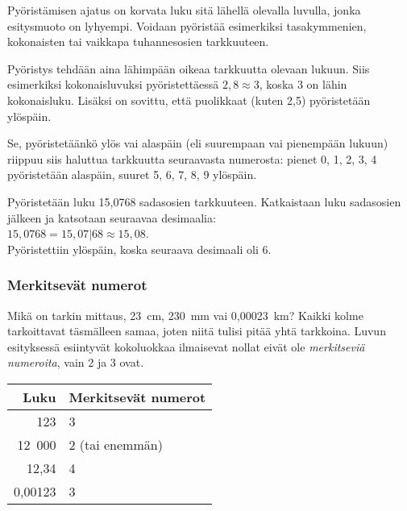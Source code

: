 Pyöristämisen ajatus on korvata luku sitä lähellä olevalla luvulla, jonka esitysmuoto on lyhyempi. Voidaan pyöristää esimerkiksi tasakymmenien, kokonaisten tai vaikkapa tuhannesosien tarkkuuteen.

Pyöristys tehdään aina lähimpään oikeaa tarkkuutta olevaan lukuun. Siis esimerkiksi kokonaisluvuksi pyöristettäessä $2,8 \approx 3$, koska 3 on lähin kokonaisluku. Lisäksi on sovittu, että puolikkaat (kuten 2,5) pyöristetään ylöspäin.

Se, pyöristetäänkö ylös vai alaspäin (eli suurempaan vai pienempään lukuun) riippuu siis haluttua tarkkuutta seuraavasta numerosta: pienet 0, 1, 2, 3, 4 pyöristetään alaspäin, suuret 5, 6, 7, 8, 9 ylöspäin.

\begin{esimerkki}
Pyöristetään luku 15,0768 sadasosien tarkkuuteen. Katkaistaan luku sadasosien jälkeen ja katsotaan seuraavaa desimaalia:\\
$15,0768 = 15,07|68 \approx 15,08$.\\
Pyöristettiin ylöspäin, koska seuraava desimaali oli 6.
\end{esimerkki}


\subsubsection*{Merkitsevät numerot}

Mikä on tarkin mittaus, 23~cm, 230~mm vai 0,00023~km? Kaikki kolme tarkoittavat täsmälleen samaa, joten niitä tulisi pitää
yhtä tarkkoina. Luvun esityksessä esiintyvät kokoluokkaa ilmaisevat nollat eivät ole \emph{merkitseviä numeroita}, vain 2 ja 3 ovat.


\begin{center}
\begin{tabular}{r|l}
Luku & Merkitsevät numerot \\
\hline
123 & 3 \\
12~000 & 2 (tai enemmän)\\
12,34 & 4 \\
0,00123 & 3
\end{tabular}
\end{center}

